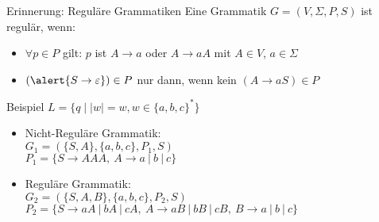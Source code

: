 \begin{frame}{Erinnerung: Reguläre Grammatiken}
  Eine Grammatik $G=(V,\Sigma,P,S)$ ist regulär, wenn:
  \begin{itemize}
    \item<3-> $\forall p\in P$ gilt: $p$ ist \alert{$A\rightarrow a$ oder $A\rightarrow aA$} mit $A\in V$, $a \in \Sigma$
    \item<4-> $(\alert{S\rightarrow\varepsilon})\in P$ nur dann, wenn kein $(A\rightarrow aS)\in P$ 
  \end{itemize}
  \begin{exampleblock}{Beispiel $L = \{q\mid |w|=w , w\in\{a,b,c\}^*\}$}
    \begin{itemize}
      \item<2-> Nicht-Reguläre Grammatik: \\
      $G_1=(\{S,A\}, \{a,b,c\}, P_1, S)$\\
      $P_1=\{S \to AAA,\ A \to a \ |\ b \ |\ c\}$
      \item<5-> Reguläre Grammatik: \\
      $G_2=(\{S,A,B\}, \{a,b,c\}, P_2, S)$\\
      $P_2=\{S \to aA \ |\ bA \ |\ cA,\ A \to aB \ |\ bB \ |\ cB,\ B \to a \ |\ b \ |\ c\}$
    \end{itemize}
  \end{exampleblock}
\end{frame}

